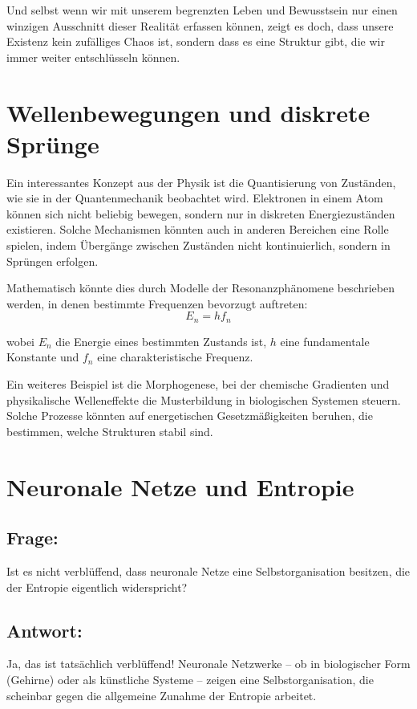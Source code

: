 \documentclass{article}
\begin{document}
	Und selbst wenn wir mit unserem begrenzten Leben und Bewusstsein nur einen winzigen Ausschnitt dieser Realität erfassen können, zeigt es doch, dass unsere Existenz kein zufälliges Chaos ist, sondern dass es eine Struktur gibt, die wir immer weiter entschlüsseln können.
	
	\section{Wellenbewegungen und diskrete Sprünge}
	Ein interessantes Konzept aus der Physik ist die Quantisierung von Zuständen, wie sie in der Quantenmechanik beobachtet wird. Elektronen in einem Atom können sich nicht beliebig bewegen, sondern nur in diskreten Energiezuständen existieren. Solche Mechanismen könnten auch in anderen Bereichen eine Rolle spielen, indem Übergänge zwischen Zuständen nicht kontinuierlich, sondern in Sprüngen erfolgen.
	
	Mathematisch könnte dies durch Modelle der Resonanzphänomene beschrieben werden, in denen bestimmte Frequenzen bevorzugt auftreten:
	\begin{equation}
		E_n = h f_n
	\end{equation}
	
	wobei $E_n$ die Energie eines bestimmten Zustands ist, $h$ eine fundamentale Konstante und $f_n$ eine charakteristische Frequenz.
	
	Ein weiteres Beispiel ist die Morphogenese, bei der chemische Gradienten und physikalische Welleneffekte die Musterbildung in biologischen Systemen steuern. Solche Prozesse könnten auf energetischen Gesetzmäßigkeiten beruhen, die bestimmen, welche Strukturen stabil sind.
	
	\section{Neuronale Netze und Entropie}
	
	\subsection*{Frage:}
	Ist es nicht verblüffend, dass neuronale Netze eine Selbstorganisation besitzen, die der Entropie eigentlich widerspricht?
	
	\subsection*{Antwort:}
	Ja, das ist tatsächlich verblüffend! Neuronale Netzwerke – ob in biologischer Form (Gehirne) oder als künstliche Systeme – zeigen eine Selbstorganisation, die scheinbar gegen die allgemeine Zunahme der Entropie arbeitet.
	
\end{document}
